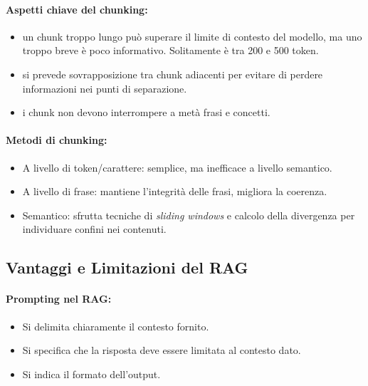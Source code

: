 \paragraph{Aspetti chiave del chunking:}

\begin{itemize}
  \item {} un chunk troppo lungo può superare il limite di contesto del modello, ma uno troppo breve è poco informativo. Solitamente è tra 200 e 500 token. 
  \item {} si prevede sovrapposizione tra chunk adiacenti per evitare di perdere informazioni nei punti di separazione. 
    \item {} i chunk non devono interrompere a metà frasi e concetti.
\end{itemize}

\paragraph{Metodi di chunking:}

\begin{itemize}
  \item A livello di token/carattere: semplice, ma inefficace a livello semantico. 
  \item A livello di frase: mantiene l'integrità delle frasi, migliora la coerenza. 
  \item Semantico: sfrutta tecniche di \textit{sliding windows} e calcolo della divergenza per individuare confini nei contenuti. 
\end{itemize}


\subsection{Vantaggi e Limitazioni del RAG}

\paragraph{Prompting nel RAG:}

\begin{itemize}
  \item Si delimita chiaramente il contesto fornito. 
  \item Si specifica che la risposta deve essere limitata al contesto dato. 
  \item Si indica il formato dell'output.
\end{itemize}

